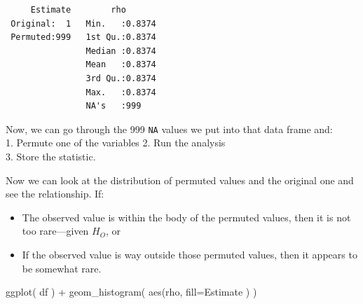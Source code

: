 \documentclass[
  letterpaper,
]{book}
\newenvironment{Shaded}{\begin{snugshade}}{\end{snugshade}}
\newcommand{\AttributeTok}[1]{\textcolor[rgb]{0.40,0.45,0.13}{#1}}
\newcommand{\CommentTok}[1]{\textcolor[rgb]{0.37,0.37,0.37}{#1}}
\newcommand{\ConstantTok}[1]{\textcolor[rgb]{0.56,0.35,0.01}{#1}}
\newcommand{\ControlFlowTok}[1]{\textcolor[rgb]{0.00,0.23,0.31}{\textbf{#1}}}
\newcommand{\DecValTok}[1]{\textcolor[rgb]{0.68,0.00,0.00}{#1}}
\newcommand{\FunctionTok}[1]{\textcolor[rgb]{0.28,0.35,0.67}{#1}}
\newcommand{\NormalTok}[1]{\textcolor[rgb]{0.00,0.23,0.31}{#1}}
\newcommand{\OtherTok}[1]{\textcolor[rgb]{0.00,0.23,0.31}{#1}}
\newcommand{\SpecialCharTok}[1]{\textcolor[rgb]{0.37,0.37,0.37}{#1}}
\providecommand{\tightlist}{%
  \setlength{\itemsep}{0pt}\setlength{\parskip}{0pt}}
\begin{document}
\begin{verbatim}
     Estimate        rho        
 Original:  1   Min.   :0.8374  
 Permuted:999   1st Qu.:0.8374  
                Median :0.8374  
                Mean   :0.8374  
                3rd Qu.:0.8374  
                Max.   :0.8374  
                NA's   :999     
\end{verbatim}

Now, we can go through the 999 \texttt{NA} values we put into that data
frame and:\\
1. Permute one of the variables 2. Run the analysis\\
3. Store the statistic.

\begin{Shaded}
\end{Shaded}

Now we can look at the distribution of permuted values and the original
one and see the relationship. If:

\begin{itemize}
\tightlist
\item
  The observed value is within the body of the permuted values, then it
  is not too rare---given \(H_O\), or
\item
  If the observed value is way outside those permuted values, then it
  appears to be somewhat rare.
\end{itemize}

\begin{Shaded}
\begin{Highlighting}[]
\FunctionTok{ggplot}\NormalTok{( df ) }\SpecialCharTok{+} 
  \FunctionTok{geom\_histogram}\NormalTok{( }\FunctionTok{aes}\NormalTok{(rho, }\AttributeTok{fill=}\NormalTok{Estimate ) )}
\end{Highlighting}
\end{Shaded}
\end{document}
